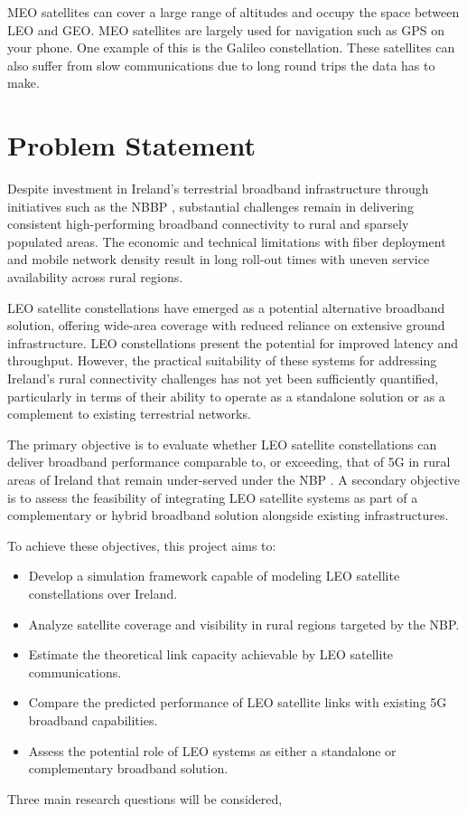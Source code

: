 MEO satellites can cover a large range of altitudes and occupy the space between LEO and GEO. MEO satellites are largely used for navigation such as GPS on your phone. One example of this is the Galileo constellation. These satellites can also suffer from slow communications due to long round trips the data has to make. \cite{esaOrbits} 


\section{Problem Statement}
Despite investment in Ireland's terrestrial broadband infrastructure through initiatives such as the NBBP \cite{NBPPolicy}, substantial challenges remain in delivering consistent high-performing broadband connectivity to rural and sparsely populated areas. The economic and technical limitations with fiber deployment and mobile network density result in long roll-out times with uneven service availability across rural regions.

LEO satellite constellations have emerged as a potential alternative broadband solution, offering wide-area coverage with reduced reliance on extensive ground infrastructure. LEO constellations present the potential for improved latency and throughput. However, the practical suitability of these systems for addressing Ireland's rural connectivity challenges has not yet been sufficiently quantified, particularly in terms of their ability to operate as a standalone solution or as a complement to existing terrestrial networks.

The primary objective is to evaluate whether LEO satellite constellations can deliver broadband performance comparable to, or exceeding, that of 5G in rural areas of Ireland that remain under-served under the NBP \cite{NBPMap}. A secondary objective is to assess the feasibility of integrating LEO satellite systems as part of a complementary or hybrid broadband solution alongside existing infrastructures.

To achieve these objectives, this project aims to:

\begin{itemize}
    \item Develop a simulation framework capable of modeling LEO satellite constellations over Ireland.
    \item Analyze satellite coverage and visibility in rural regions targeted by the NBP.
    \item Estimate the theoretical link capacity achievable by LEO satellite communications.
    \item Compare the predicted performance of LEO satellite links with existing 5G broadband capabilities.
    \item Assess the potential role of LEO systems as either a standalone or complementary broadband solution.
\end{itemize}
Three main research questions will be considered,

